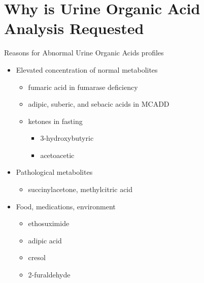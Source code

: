 \documentclass[presentation, smaller]{beamer}
\begin{document}
\section{Why is Urine Organic Acid Analysis Requested}
\label{sec:orgheadline15}
\begin{frame}[label={sec:orgheadline9}]{Reasons for Abnormal Urine Organic Acids profiles}
\begin{itemize}
\item Elevated concentration of normal metabolites
\begin{itemize}
\item fumaric acid in fumarase deficiency
\item adipic, suberic, and sebacic acids in MCADD
\item ketones in fasting
\begin{itemize}
\item 3-hydroxybutyric
\item acetoacetic
\end{itemize}
\end{itemize}

\item Pathological metabolites
\begin{itemize}
\item succinylacetone, methylcitric acid
\end{itemize}

\item Food, medications, environment
\begin{itemize}
\item ethosuximide
\item adipic acid
\item cresol
\item 2-furaldehyde
\end{itemize}
\end{itemize}
\end{frame}
\end{document}
